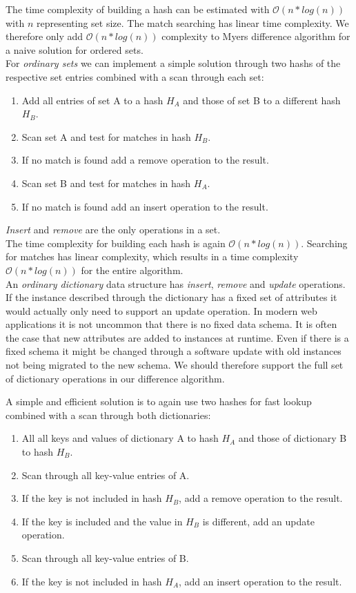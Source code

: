 The time complexity of building a hash can be estimated with $ \mathcal O(n * log(n)) $ with $ n $ representing set size.
The match searching has linear time complexity.
We therefore only add $ \mathcal O(n * log(n)) $ complexity to Myers difference algorithm for a naive solution for ordered sets.\\

For \emph{ordinary sets} we can implement a simple solution through two hashs of the respective set entries combined with a scan through each set:

\begin{enumerate}
\item Add all entries of set A to a hash $ H_A $ and those of set B to a different hash $ H_B $.
\item Scan set A and test for matches in hash $ H_B $.
\item If no match is found add a remove operation to the result.
\item Scan set B and test for matches in hash $ H_A $.
\item If no match is found add an insert operation to the result.
\end{enumerate}

\emph{Insert} and \emph{remove} are the only operations in a set.\\
The time complexity for building each hash is again $ \mathcal O(n * log(n)) $.
Searching for matches has linear complexity, which results in a time complexity $ \mathcal O(n * log(n)) $ for the entire algorithm.\\

An \emph{ordinary dictionary} data structure has \emph{insert}, \emph{remove} and \emph{update} operations.
If the instance described through the dictionary has a fixed set of attributes it would actually only need to support an update operation.
In modern web applications it is not uncommon that there is no fixed data schema.
It is often the case that new attributes are added to instances at runtime.
Even if there is a fixed schema it might be changed through a software update with old instances not being migrated to the new schema.
We should therefore support the full set of dictionary operations in our difference algorithm.

A simple and efficient solution is to again use two hashes for fast lookup combined with a scan through both dictionaries:

\begin{enumerate}
\item All all keys and values of dictionary A to hash $ H_A $ and those of dictionary B to hash $ H_B $.
\item Scan through all key-value entries of A.
\item If the key is not included in hash $ H_B $, add a remove operation to the result.
\item If the key is included and the value in $ H_B $ is different, add an update operation.
\item Scan through all key-value entries of B.
\item If the key is not included in hash $ H_A $, add an insert operation to the result.
\end{enumerate}

